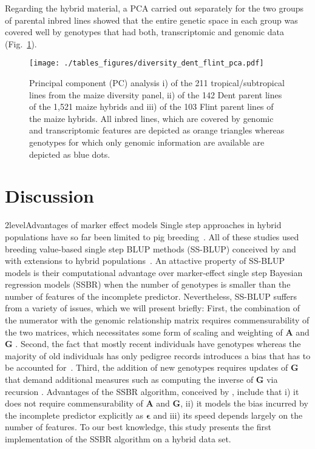 \documentclass[12pt,titlepage]{article}
\begin{document}
Regarding the hybrid material, a PCA carried out separately for the two groups
of parental inbred lines showed that the entire genetic space in each group 
was covered well by genotypes that had both, transcriptomic and genomic data 
(Fig.~\ref{fig:PCA}).

\begin{figure}[H]
\centering
\texttt{[image: ./tables\_figures/diversity\_dent\_flint\_pca.pdf]}
\caption{
  Principal component (PC) analysis i) of the 211 tropical/subtropical lines 
  from the maize diversity panel, ii) of the 142 Dent parent lines of the 1,521
  maize hybrids and iii) of the 103 Flint parent lines of the maize hybrids.
  All inbred lines, which are covered by genomic and transcriptomic features
  are depicted as orange triangles whereas genotypes for which only genomic
  information are available are depicted as blue dots.
}
\label{fig:PCA}
\end{figure}













\section*{Discussion}
\Genetics2level{Advantages of marker effect models}
Single step approaches in hybrid populations have so far been limited to pig
breeding~\cite{Xiang2015,Xiang2016,Tusell2016}.
All of these studies used breeding value-based single step BLUP methods
(SS-BLUP) conceived by  and  with
extensions to hybrid populations~\cite{Christensen2014,Christensen2015}.
An attactive property of SS-BLUP models is their computational advantage over 
marker-effect single step Bayesian regression models (SSBR) when the number of 
genotypes is smaller than the number of features of the incomplete predictor.
Nevertheless, SS-BLUP suffers from a variety of issues, which we will present
briefly:
First, the combination of the numerator with the genomic relationship matrix
requires commensurability of the two matrices, which necessitates some form of
scaling and weighting of $\mathbf{A}$ and $\mathbf{G}$
\cite{Christensen2012,Christensen2012a}.
Second, the fact that mostly recent individuals have genotypes whereas the 
majority of old individuals has only pedigree records introduces a bias that 
has to be accounted for~\cite{Vitezica2011,Legarra2015,Garcia-Baccino2017}.
Third, the addition of new genotypes requires updates of $\mathbf{G}$ that
demand additional measures such as computing the inverse of $\mathbf{G}$ via
recursion
\cite{Misztal2014,Misztal2016,Misztal2016a,Fragomeni2015,Masuda2016,Pocrnic2016}.
Advantages of the SSBR algorithm, conceived by , include
that i) it does not require commensurability of $\mathbf{A}$ and $\mathbf{G}$, 
ii) it models the bias incurred by the incomplete predictor explicitly as 
$\mathbf{\epsilon}$ and iii) its speed depends largely on the number of 
features.
To our best knowledge, this study presents the first implementation of the SSBR 
algorithm on a hybrid data set.
\end{document}
